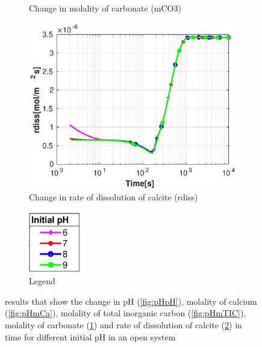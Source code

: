 \begin{figure}[!h]
\begin{subfigure}{.5\linewidth}
        \caption{Change in molality of carbonate (mCO3)}
        \label{fig:pHmCO3}
    \end{subfigure}%
    \hfill
    \begin{subfigure}{.5\linewidth}
            \centering
        \includegraphics[width=\textwidth]{PICTURES/with_pH_rdiss.eps}
        \caption{Change in rate of dissolution of calcite (rdiss)}
        \label{fig:pHrdiss}
    \end{subfigure}%
  \hfill
  \begin{subfigure}{.5\linewidth}
            \centering
        \includegraphics[width=0.25\textwidth]{PICTURES/with_pH_legend.eps}
        \caption{Legend}
        \label{fig:pHlegend}
    \end{subfigure}%
    \caption{\DuMuX results that show the change in pH (\cref{fig:pHpH}), molality of calcium (\cref{fig:pHmCa}), 
    molality of total inorganic carbon (\cref{fig:pHmTIC}), molality of carbonate (\cref{fig:pHmCO3}) and rate of 
    dissolution of calcite (\cref{fig:pHrdiss}) in time for different initial pH in an open system}
    \label{fig:comparisionDiffInitialpH}
\end{figure}


